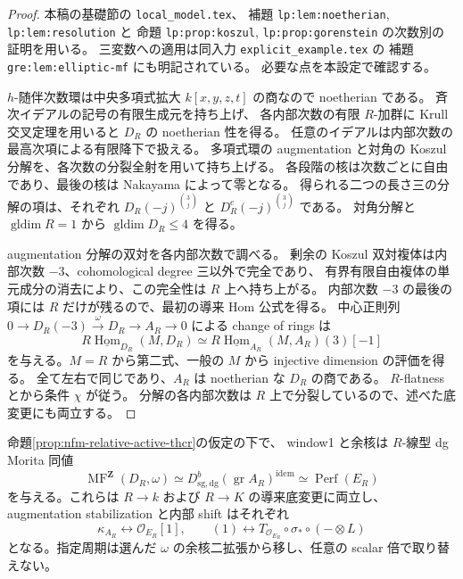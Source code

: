 \begin{proof}
本稿の基礎節の \texttt{local\_model.tex}、
補題 \texttt{lp:lem:noetherian}, \texttt{lp:lem:resolution} と
命題 \texttt{lp:prop:koszul}, \texttt{lp:prop:gorenstein} の次数別の証明を用いる。
三変数への適用は同入力 \texttt{explicit\_example.tex} の
補題 \texttt{gre:lem:elliptic-mf} にも明記されている。
必要な点を本設定で確認する。

$h$-随伴次数環は中央多項式拡大 $k[x,y,z,t]$ の商なので noetherian である。
斉次イデアルの記号の有限生成元を持ち上げ、
各内部次数の有限 $R$-加群に Krull 交叉定理を用いると $D_R$ の noetherian 性を得る。
任意のイデアルは内部次数の最高次項による有限降下で扱える。
多項式環の augmentation と対角の Koszul 分解を、各次数の分裂全射を用いて持ち上げる。
各段階の核は次数ごとに自由であり、最後の核は Nakayama によって零となる。
得られる二つの長さ三の分解の項は、それぞれ
$D_R(-j)^{\binom3j}$ と $D_R^e(-j)^{\binom3j}$ である。
対角分解と $\operatorname{gldim}R=1$ から $\operatorname{gldim}D_R\le4$ を得る。

augmentation 分解の双対を各内部次数で調べる。
剰余の Koszul 双対複体は内部次数 $-3$、cohomological degree 三以外で完全であり、
有界有限自由複体の単元成分の消去により、この完全性は $R$ 上へ持ち上がる。
内部次数 $-3$ の最後の項には $R$ だけが残るので、最初の導来 Hom 公式を得る。
中心正則列
$0\to D_R(-3)\xrightarrow\omega D_R\to A_R\to0$ による change of rings は
\[
 R\underline{\operatorname{Hom}}_{D_R}(M,D_R)
 \simeq R\underline{\operatorname{Hom}}_{A_R}(M,A_R)(3)[-1]
\]
を与える。$M=R$ から第二式、一般の $M$ から injective dimension の評価を得る。
全て左右で同じであり、$A_R$ は noetherian な $D_R$ の商である。
$R$-flatness と\cite[Definition~5.1 and Lemma~6.2]{NFMBurkeStevenson}から条件 $\chi$ が従う。
分解の各内部次数は $R$ 上で分裂しているので、述べた底変更にも両立する。
\end{proof}

\begin{proposition}
\label{prop:nfm-relative-active-window-basechange}
命題\ref{prop:nfm-relative-active-thcr}の仮定の下で、
window1 と余核は $R$-線型 dg Morita 同値
\begin{equation}\label{eq:nfm-relative-active-window-proved}
 \operatorname{MF}^{\mathbf Z}(D_R,\omega)
 \simeq D^b_{\mathrm{sg,dg}}(\operatorname{gr}A_R)^{\mathrm{idem}}
 \simeq\operatorname{Perf}(E_R)
\end{equation}
を与える。これらは $R\to k$ および $R\to K$ の導来底変更に両立し、
augmentation stabilization と内部 shift はそれぞれ
\[
 \kappa_{A_R}\longleftrightarrow\mathcal O_{E_R}[1],\qquad
 (1)\longleftrightarrow
 T_{\mathcal O_{E_R}}\circ\sigma_*\circ(-\otimes L)
\]
となる。指定周期は選んだ $\omega$ の余核二拡張から移し、任意の scalar 倍で取り替えない。
\end{proposition}

